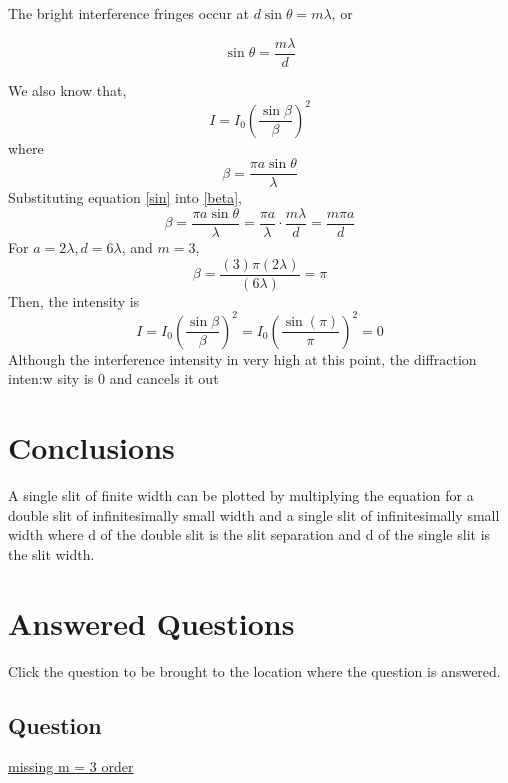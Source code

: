 \documentclass{report}
\begin{document}
\noindent The bright interference fringes occur at $d \sin \theta=m \lambda$, or

\begin{equation}
    \sin \theta=\frac{m \lambda}{d}
    \label{sin}
\end{equation}

    We also know that,
$$
I=I_{0}\left(\frac{\sin \beta}{\beta}\right)^{2}
$$
    where
\begin{equation}
    \beta=\frac{\pi a \sin \theta}{\lambda}
    \label{beta}
\end{equation}
    Substituting equation \ref{sin} into \ref{beta},
$$
\beta=\frac{\pi a \sin \theta}{\lambda}=\frac{\pi a}{\lambda} \cdot \frac{m \lambda}{d}=\frac{m \pi a}{d}
$$
For $a=2 \lambda, d=6 \lambda$, and $m=3$,
$$
    \beta=\frac{(3) \pi(2 \lambda)}{(6 \lambda)}=\pi
$$
Then, the intensity is
$$
    I=I_{0}\left(\frac{\sin \beta}{\beta}\right)^{2}=I_{0}\left(\frac{\sin (\pi)}{\pi}\right)^{2}=0
$$
Although the interference intensity in very high at this point, the diffraction inten:w
sity is 0 and cancels it out

\chapter{Conclusions}

A single slit of finite width can be plotted by multiplying the equation for a double slit of infinitesimally small width and a single slit of infinitesimally small width where d of the double slit is the slit separation and d of the single slit is the slit width.



\chapter{Answered Questions}
Click the question to be brought to the location where the question is answered.

\section{Question}
\hyperref[Question]{missing m = 3 order}
\end{document}
